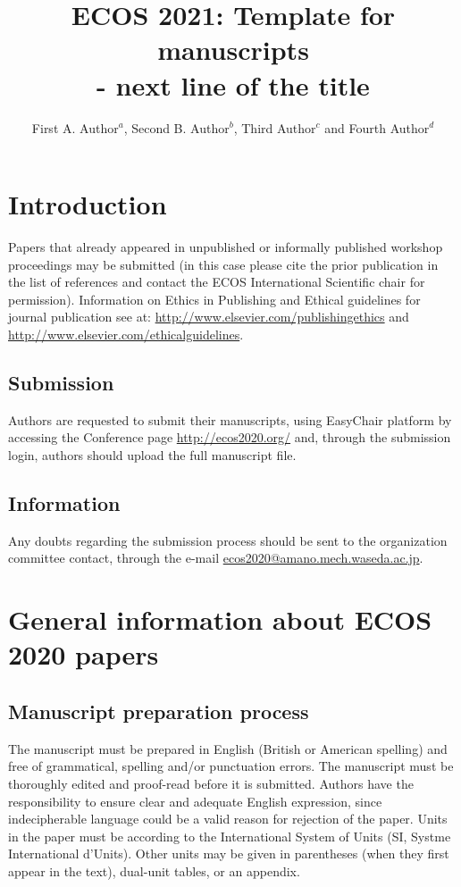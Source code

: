 \documentclass{ECOS_2021}
\title{\sffamily ECOS 2021: Template for manuscripts  \\ - next line of the title}
\author{First A. Author$^{a}$, Second B. Author$^{b}$, Third Author$^{c}$ and Fourth Author$^{d}$}
\begin{document}

\sffamily \Large \section{Introduction} \label{Introduction} 
\rmfamily \normalsize 
Papers that already appeared in unpublished or informally published workshop proceedings may be submitted (in this case please cite the prior publication in the list of references and contact the ECOS International Scientific chair for permission). Information on Ethics in Publishing and Ethical guidelines for journal publication see at: \url{http://www.elsevier.com/publishingethics} and \url{http://www.elsevier.com/ethicalguidelines}.

\sffamily \large \subsection{Submission} \label{Submission}
\rmfamily \normalsize
Authors are requested to submit their manuscripts, using EasyChair platform by accessing the Conference page \url{http://ecos2020.org/} and, through the submission login, authors should upload the full manuscript file.

\sffamily \large \subsection{Information} \label{Information}
\rmfamily \normalsize 
Any doubts regarding the submission process should be sent to the organization committee contact, through the e-mail \href{mailto:ecos2020@amano.mech.waseda.ac.jp}{ecos2020@amano.mech.waseda.ac.jp}.

\sffamily \Large \section{General information about ECOS 2020 papers} \label{General}
\rmfamily \normalsize 
\sffamily \large \subsection{Manuscript preparation process} \label{Manuscript preparation process}
\rmfamily \normalsize 
The manuscript must be prepared in English (British or American spelling) and free of grammatical, spelling and/or punctuation errors. The manuscript must be thoroughly edited and proof-read before it is submitted. Authors have the responsibility to ensure clear and adequate English expression, since indecipherable language could be a valid reason for rejection of the paper.
Units in the paper must be according to the International System of Units (SI, Systme International d'Units). Other units may be given in parentheses (when they first appear in the text), dual-unit tables, or an appendix.
\end{document}
